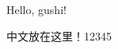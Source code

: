 \documentclass[a4paper,12pt]{article}
\begin{document}
Hello, gushi!

中文放在这里！12345

\nocite{*}


\end{document}

